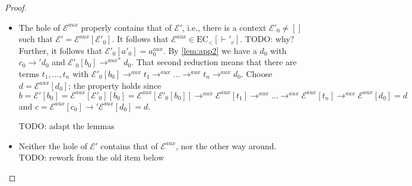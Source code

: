 \begin{proof}
\begin{itemize}
\item The hole of $\mathcal{E}^{aux}$ properly contains that of $\mathcal{E}'$, i.e., there is a context $\mathcal{E}'_0 \neq []$ such that $\mathcal{E}' = \mathcal{E}^{aux}[\mathcal{E}'_0]$. It follows that $\mathcal{E}^{aux} \in \textrm{EC}_<[\vdash'_v]$. TODO: why? Further, it follows that $\mathcal{E}'_0[a'_0] = a^{aux}_0$. By \autoref{lem:app2} we have a $d_0$ with $c_0 \longrightarrow' d_0$ and $\mathcal{E}'_0[b_0] {\longrightarrow^{aux}}^* d_0$. That second reduction means that there are terms $t_1, ..., t_n$ with $\mathcal{E}'_0[b_0] \longrightarrow^{aux} t_1 \longrightarrow^{aux} ... \longrightarrow^{aux} t_n \longrightarrow^{aux} d_0$. Choose $d = \mathcal{E}^{aux}[d_0]$; the property holds since $b = \mathcal{E}'[b_0] = \mathcal{E}^{aux}[\mathcal{E}'_0][b_0] = \mathcal{E}^{aux}[\mathcal{E}'_0[b_0]] \longrightarrow^{aux} \mathcal{E}^{aux}[t_1] \longrightarrow^{aux} ... \longrightarrow^{aux} \mathcal{E}^{aux}[t_n] \longrightarrow^{aux} \mathcal{E}^{aux}[d_0] = d$ and $c = \mathcal{E}^{aux}[c_0] \longrightarrow' \mathcal{E}^{aux}[d_0] = d$.

TODO: adapt the lemmas

\item Neither the hole of $\mathcal{E}'$ contains that of $\mathcal{E}^{aux}$, nor the other way around. TODO: rework from the old item below

\end{itemize}

\end{proof}

